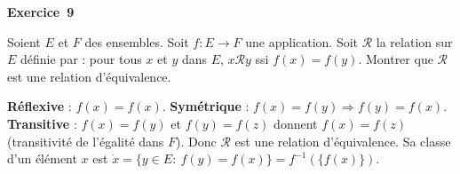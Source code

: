 \documentclass[11pt,a4paper]{article}
\begin{document}
	\medskip\noindent\textbf{\Large\color{bleu}Exercice~9}\nopagebreak
	\begin{enonce}
		Soient $E$ et $F$ des ensembles. Soit $f : E \to F$ une application. Soit $\mathcal{R}$ la relation sur $E$ définie par : pour tous $x$ et $y$ dans $E$, $x\mathcal{R}y$ ssi $f(x)=f(y)$. Montrer que $\mathcal{R}$ est une relation d'équivalence.
	\end{enonce}
	\begin{corrige}
		\textbf{Réflexive} : $f(x)=f(x)$. \textbf{Symétrique} : $f(x)=f(y)\Rightarrow f(y)=f(x)$. \textbf{Transitive} : $f(x)=f(y)$ et $f(y)=f(z)$ donnent $f(x)=f(z)$ (transitivité de l'égalité dans $F$). Donc $\mathcal R$ est une relation d'équivalence. Sa classe d'un élément $x$ est $\dot x=\{y\in E:\ f(y)=f(x)\}=f^{-1}(\{f(x)\})$.
	\end{corrige}
	
\end{document}
